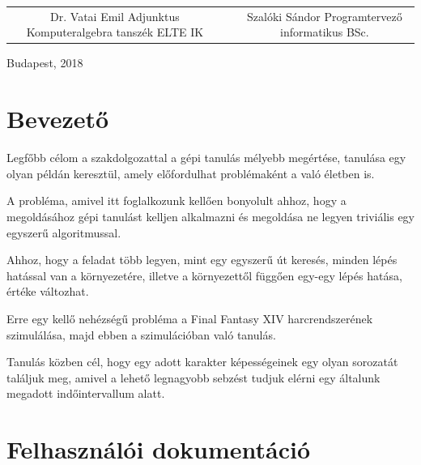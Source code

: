 \documentclass[12pt]{article}
\begin{document}
\begin{titlepage}
		\begin{tabular}{cp{1cm}c}
			\begin{minipage}{7cm}
				\vspace{0pt}Dr. Vatai Emil \vspace{10pt} \newline
				Adjunktus \newline
				Komputeralgebra tanszék \newline
				ELTE IK
			\end{minipage} & &
			\begin{minipage}{7cm}
				\vspace{0pt}Szalóki Sándor \vspace{10pt} \newline
				Programtervező informatikus BSc.
			\end{minipage}
		\end{tabular}
			
		
		\vfill
		
		\vspace*{1cm}
		Budapest, 2018
	\end{titlepage}
	
	\tableofcontents
	\newpage
	
	\section{Bevezető}
	
	Legfőbb célom a szakdolgozattal a gépi tanulás mélyebb megértése, tanulása egy olyan példán keresztül, amely előfordulhat problémaként a való életben is.
	
	A probléma, amivel itt foglalkozunk kellően bonyolult ahhoz, hogy a megoldásához gépi tanulást kelljen alkalmazni és megoldása ne legyen triviális egy egyszerű algoritmussal.
	
	Ahhoz, hogy a feladat több legyen, mint egy egyszerű út keresés, minden lépés hatással van a környezetére, illetve a környezettől függően egy-egy lépés hatása, értéke változhat.
	
	Erre egy kellő nehézségű probléma a Final Fantasy XIV harcrendszerének szimulálása, majd ebben a szimulációban való tanulás.
	
	Tanulás közben cél, hogy egy adott karakter képességeinek egy olyan sorozatát találjuk meg, amivel a lehető legnagyobb sebzést tudjuk elérni egy általunk megadott indőintervallum alatt.
	
	\pagebreak
	
	\section{Felhasználói dokumentáció}
	
\end{document}
